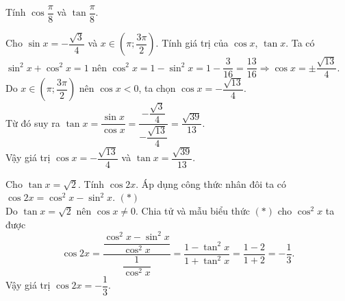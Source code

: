\begin{bt}%
	Tính $\cos \dfrac{\pi}{8}$ và $\tan \dfrac{\pi}{8}$.
\end{bt}

\begin{bt}%
	Cho $\sin x=-\dfrac{\sqrt{3}}{4}$ và $x \in\left(\pi ; \dfrac{3 \pi}{2}\right)$. Tính giá trị của $\cos x$, $\tan x$.
	\loigiai
	{Ta có $\sin^2x+\cos^2x=1$ nên $\cos^2x=1-\sin^2x=1-\dfrac{3}{16}=\dfrac{13}{16}\Rightarrow \cos x=\pm\dfrac{\sqrt{13}}{4}$.\\
		Do $x\in\left(\pi; \dfrac{3\pi}{2}\right)$ nên $\cos x<0$, ta chọn $\cos x=-\dfrac{\sqrt{13}}{4}$.\\
		Từ đó suy ra 
		$\tan x =\dfrac{\sin x }{\cos x}=\dfrac{-\dfrac{\sqrt{3}}{4}}{-\dfrac{\sqrt{13}}{4}}=\dfrac{\sqrt{39}}{13}$.\\
		Vậy giá trị  $\cos x= -\dfrac{\sqrt{13}}{4}$ và $\tan x=\dfrac{\sqrt{39}}{13}$.
	}
\end{bt}

\begin{bt}%
	Cho $\tan x=\sqrt{2}$. Tính $\cos 2x$.
	\loigiai
	{Áp dụng công thức nhân đôi ta có $\cos 2x=\cos^2x-\sin^2x$. \hfill $(*)$\\
		Do $\tan x=\sqrt{2}$ nên $\cos x\neq 0$. Chia tử và mẫu biểu thức $(*)$ cho $\cos^2x$ ta được
		\[ \cos 2x=\dfrac{\dfrac{\cos^2x-\sin^2x}{\cos^2x}}{\dfrac{1}{\cos^2 x}}=\dfrac{1-\tan^2x}{1+\tan^2 x}=\dfrac{1-2}{1+2}=-\dfrac{1}{3}.\]  
		Vậy giá trị $\cos 2x=-\dfrac{1}{3}$.
	}
\end{bt}

